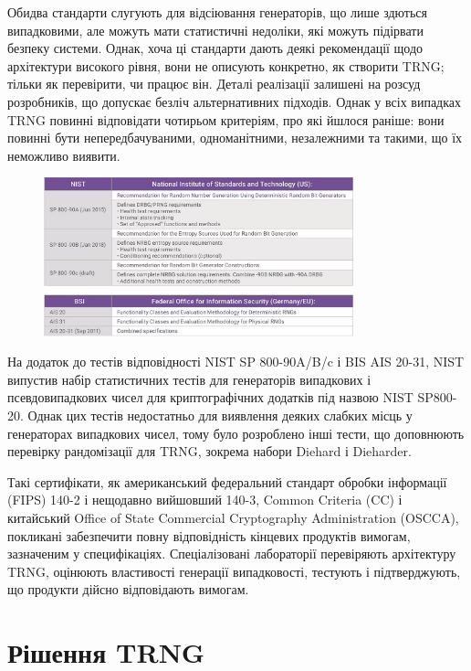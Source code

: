 Обидва стандарти слугують для відсіювання генераторів, що лише здються випадковими, але можуть мати статистичні недоліки, які можуть підірвати безпеку системи. Однак, хоча ці стандарти дають деякі рекомендації щодо архітектури високого рівня, вони не описують конкретно, як створити TRNG; тільки як перевірити, чи працює він. Деталі реалізації залишені на розсуд розробників, що допускає безліч альтернативних підходів. Однак у всіх випадках TRNG повинні відповідати чотирьом критеріям, про які йшлося раніше: вони повинні бути непередбачуваними, одноманітними, незалежними та такими, що їх неможливо виявити.

\begin{figure}[h]
  \centering
  \includegraphics[width=0.8\textwidth]{IMAGES/02.jpg}
  \label{fig:fig1}
\end{figure}

На додаток до тестів відповідності NIST SP 800-90A/B/c і BIS AIS 20-31, NIST випустив набір статистичних тестів для генераторів випадкових і псевдовипадкових чисел для криптографічних додатків під назвою NIST SP800-20. Однак цих тестів недостатньо для виявлення деяких слабких місць у генераторах випадкових чисел, тому було розроблено інші тести, що доповнюють перевірку рандомізації для TRNG, зокрема набори Diehard і Dieharder. 


Такі сертифікати, як американський федеральний стандарт обробки інформації (FIPS) 140-2 і нещодавно вийшовший 140-3, Common Criteria (CC) і китайський Office of State Commercial Cryptography Administration (OSCCA), покликані забезпечити повну відповідність кінцевих продуктів вимогам, зазначеним у специфікаціях. Спеціалізовані лабораторії перевіряють архітектуру TRNG, оцінюють властивості генерації випадковості, тестують і підтверджують, що продукти дійсно відповідають вимогам.

\section{Рішення TRNG}

